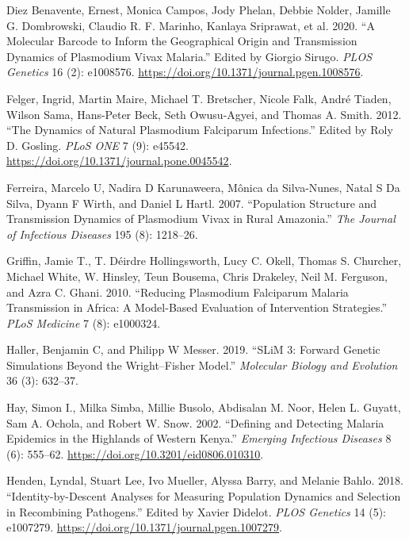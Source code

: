 \documentclass[
  11pt,
]{article}
\newlength{\cslhangindent}
\newenvironment{CSLReferences}[2] %
 {\begin{list}{}{%
  \setlength{\itemindent}{0pt}
  \setlength{\leftmargin}{0pt}
  \setlength{\parsep}{0pt}
  \ifodd #1
   \setlength{\leftmargin}{\cslhangindent}
   \setlength{\itemindent}{-1\cslhangindent}
  \fi
  \setlength{\itemsep}{#2\baselineskip}}}
 {\end{list}}
\begin{document}
\begin{CSLReferences}{1}{0}
Diez Benavente, Ernest, Monica Campos, Jody Phelan, Debbie Nolder,
Jamille G. Dombrowski, Claudio R. F. Marinho, Kanlaya Sriprawat, et al.
2020. {``A Molecular Barcode to Inform the Geographical Origin and
Transmission Dynamics of Plasmodium Vivax Malaria.''} Edited by Giorgio
Sirugo. \emph{PLOS Genetics} 16 (2): e1008576.
\url{https://doi.org/10.1371/journal.pgen.1008576}.

Felger, Ingrid, Martin Maire, Michael T. Bretscher, Nicole Falk, André
Tiaden, Wilson Sama, Hans-Peter Beck, Seth Owusu-Agyei, and Thomas A.
Smith. 2012. {``The Dynamics of Natural Plasmodium Falciparum
Infections.''} Edited by Roly D. Gosling. \emph{PLoS ONE} 7 (9): e45542.
\url{https://doi.org/10.1371/journal.pone.0045542}.

Ferreira, Marcelo U, Nadira D Karunaweera, Mônica da Silva-Nunes, Natal
S Da Silva, Dyann F Wirth, and Daniel L Hartl. 2007. {``Population
Structure and Transmission Dynamics of Plasmodium Vivax in Rural
Amazonia.''} \emph{The Journal of Infectious Diseases} 195 (8):
1218--26.

Griffin, Jamie T., T. Déirdre Hollingsworth, Lucy C. Okell, Thomas S.
Churcher, Michael White, W. Hinsley, Teun Bousema, Chris Drakeley, Neil
M. Ferguson, and Azra C. Ghani. 2010. {``Reducing Plasmodium Falciparum
Malaria Transmission in Africa: A Model-Based Evaluation of Intervention
Strategies.''} \emph{PLoS Medicine} 7 (8): e1000324.

Haller, Benjamin C, and Philipp W Messer. 2019. {``SLiM 3: Forward
Genetic Simulations Beyond the Wright--Fisher Model.''} \emph{Molecular
Biology and Evolution} 36 (3): 632--37.

Hay, Simon I., Milka Simba, Millie Busolo, Abdisalan M. Noor, Helen L.
Guyatt, Sam A. Ochola, and Robert W. Snow. 2002. {``Defining and
Detecting Malaria Epidemics in the Highlands of Western Kenya.''}
\emph{Emerging Infectious Diseases} 8 (6): 555--62.
\url{https://doi.org/10.3201/eid0806.010310}.

Henden, Lyndal, Stuart Lee, Ivo Mueller, Alyssa Barry, and Melanie
Bahlo. 2018. {``Identity-by-Descent Analyses for Measuring Population
Dynamics and Selection in Recombining Pathogens.''} Edited by Xavier
Didelot. \emph{PLOS Genetics} 14 (5): e1007279.
\url{https://doi.org/10.1371/journal.pgen.1007279}.


\end{CSLReferences}
\end{document}

